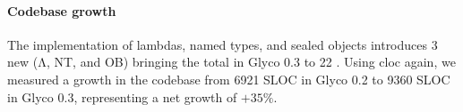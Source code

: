 \documentclass[main.tex]{subfiles}
\begin{document}
\paragraph{Codebase growth} The implementation of lambdas, named types, and sealed objects introduces 3 new  (Λ, NT, and OB) bringing the total in Glyco 0.3 to 22 . Using cloc again, we measured a growth in the codebase from 6921 SLOC in Glyco 0.2 to 9360 SLOC in Glyco 0.3, representing a net growth of $+35\%$.

\onlyinsubfile{\glsaddall\printglossaries}
\end{document}
